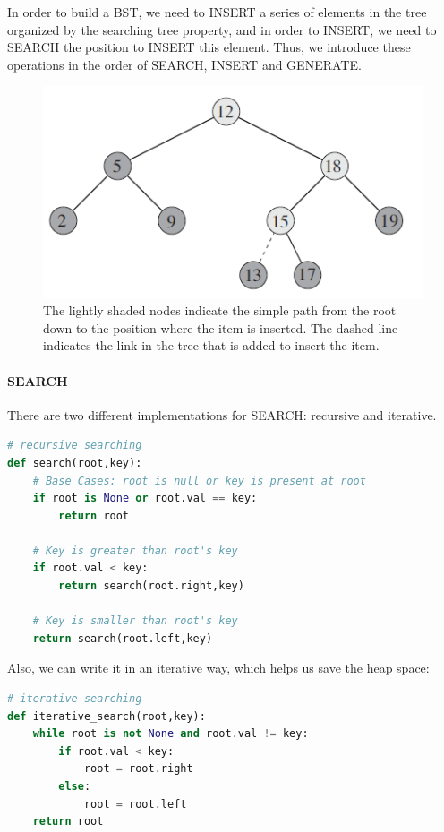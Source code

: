 \documentclass[../main.tex]{subfiles}
\begin{document}
In order to build a BST, we need to INSERT a series of elements in the tree organized by the searching tree property, and in order to INSERT, we need to SEARCH the position to INSERT this element. Thus, we introduce these operations in the order of SEARCH, INSERT and GENERATE. 
\begin{figure}[h]
    \centering
    \includegraphics[width=0.6\columnwidth]{fig/bst_insertion.png}
    \caption{The lightly shaded nodes indicate the simple path from the root down to the position where the item is inserted. The dashed line indicates the link in the tree that is added to insert the item. }
    \label{fig:bst_operation}
\end{figure}
\paragraph{SEARCH}

There are two different implementations for SEARCH: recursive and iterative.
\begin{lstlisting}[language = Python]
# recursive searching
def search(root,key):
    # Base Cases: root is null or key is present at root
    if root is None or root.val == key:
        return root
 
    # Key is greater than root's key
    if root.val < key:
        return search(root.right,key)
   
    # Key is smaller than root's key
    return search(root.left,key)
\end{lstlisting}
Also, we can write it in an iterative way, which helps us save the heap space: 
\begin{lstlisting}[language = Python]
# iterative searching
def iterative_search(root,key):
    while root is not None and root.val != key:
        if root.val < key:
            root = root.right
        else:
            root = root.left
    return root
\end{lstlisting}
\end{document}
